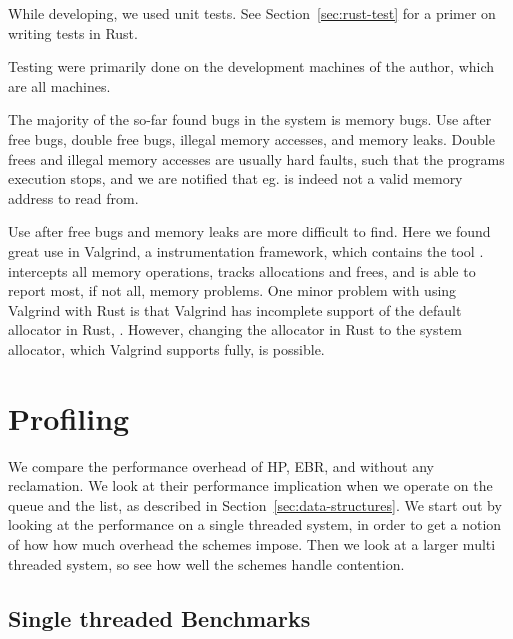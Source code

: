 \documentclass[b5paper]{report}
\begin{document}
While developing, we used unit tests. See Section~\ref{sec:rust-test} for a
primer on writing tests in Rust.

Testing were primarily done on the development machines of the author, which are
all  machines. 

The majority of the so-far found bugs in the system is memory bugs. Use after
free bugs, double free bugs, illegal memory accesses, and memory leaks. Double
frees and illegal memory accesses are usually hard faults, such that the
programs execution stops, and we are notified that eg.  is indeed not
a valid memory address to read from.

Use after free bugs and memory leaks are more difficult to find. Here we found
great use in Valgrind\cite{valgrind}, a instrumentation framework, which
contains the tool .  intercepts all memory
operations, tracks allocations and frees, and is able to report most, if not
all, memory problems. One minor problem with using Valgrind with Rust is that
Valgrind has incomplete support of the default allocator in Rust,
\cite{jemalloc}. However, changing the allocator in Rust to the system
allocator, which Valgrind supports fully, is possible.



\section{Profiling}

We compare the performance overhead of HP, EBR, and without any reclamation. We
look at their performance implication when we operate on the queue and the list,
as described in Section~\ref{sec:data-structures}. We start out by looking at
the performance on a single threaded system, in order to get a notion of how how
much overhead the schemes impose. Then we look at a larger multi threaded system,
so see how well the schemes handle contention. 


\subsection{Single threaded Benchmarks}
\end{document}

